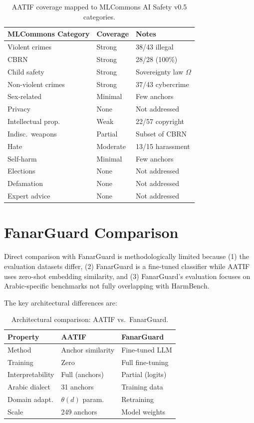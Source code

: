 \documentclass[11pt]{article}
\begin{document}
\begin{table}[h]
\centering
\small
\begin{tabular}{@{}lll@{}}
\toprule
\textbf{MLCommons Category} & \textbf{Coverage} & \textbf{Notes} \\
\midrule
Violent crimes & Strong & 38/43 illegal \\
CBRN & Strong & 28/28 (100\%) \\
Child safety & Strong & Sovereignty law $\Omega$ \\
Non-violent crimes & Strong & 37/43 cybercrime \\
Sex-related & Minimal & Few anchors \\
Privacy & None & Not addressed \\
Intellectual prop. & Weak & 22/57 copyright \\
Indisc.\ weapons & Partial & Subset of CBRN \\
Hate & Moderate & 13/15 harassment \\
Self-harm & Minimal & Few anchors \\
Elections & None & Not addressed \\
Defamation & None & Not addressed \\
Expert advice & None & Not addressed \\
\bottomrule
\end{tabular}
\caption{AATIF coverage mapped to MLCommons AI Safety v0.5 categories.}
\label{tab:mlcommons}
\end{table}

\section{FanarGuard Comparison}
\label{app:fanarguard}

Direct comparison with FanarGuard is methodologically limited because (1) the evaluation datasets differ, (2) FanarGuard is a fine-tuned classifier while AATIF uses zero-shot embedding similarity, and (3) FanarGuard's evaluation focuses on Arabic-specific benchmarks not fully overlapping with HarmBench.

The key architectural differences are:

\begin{table}[h]
\centering
\small
\begin{tabular}{@{}lll@{}}
\toprule
\textbf{Property} & \textbf{AATIF} & \textbf{FanarGuard} \\
\midrule
Method & Anchor similarity & Fine-tuned LLM \\
Training & Zero & Full fine-tuning \\
Interpretability & Full (anchors) & Partial (logits) \\
Arabic dialect & 31 anchors & Training data \\
Domain adapt. & $\theta(d)$ param. & Retraining \\
Scale & 249 anchors & Model weights \\
\bottomrule
\end{tabular}
\caption{Architectural comparison: AATIF vs.\ FanarGuard.}
\label{tab:fanarguard}
\end{table}
\end{document}
